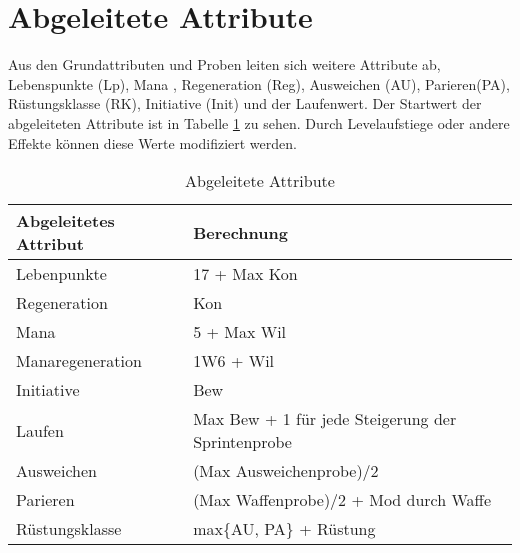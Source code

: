 \documentclass[../../Heldenanleitung2]{subfiles}
\begin{document}
\section{Abgeleitete Attribute}
Aus den Grundattributen und Proben leiten sich weitere Attribute ab, Lebenspunkte (Lp), Mana , Regeneration (Reg), Ausweichen (AU), Parieren(PA), Rüstungsklasse (RK), Initiative (Init) und der Laufenwert. Der Startwert der abgeleiteten Attribute ist in Tabelle \ref{tab:AbgeleiteteAtribute} zu sehen. Durch Levelaufstiege oder andere Effekte können diese Werte modifiziert werden.

\renewcommand{\arraystretch}{1.5}
{
\begin{table}[h!]
\centering
\caption{Abgeleitete Attribute}
\label{tab:AbgeleiteteAtribute}
\begin{tabular}{|l|l|}
\hline
\textbf{Abgeleitetes Attribut} & \textbf{Berechnung}\\
\hline
Lebenpunkte & 17 + Max Kon\\
Regeneration & Kon\\
Mana & 5 + Max Wil\\
Manaregeneration & 1W6 + Wil\\
Initiative & Bew\\
Laufen & Max Bew + 1 für jede Steigerung der Sprintenprobe\\
Ausweichen & (Max Ausweichenprobe)/2\\
Parieren & (Max Waffenprobe)/2 + Mod durch Waffe\\
Rüstungsklasse & max\{AU, PA\} + Rüstung
\\
\hline
\end{tabular}
\end{table}
}
\end{document}
